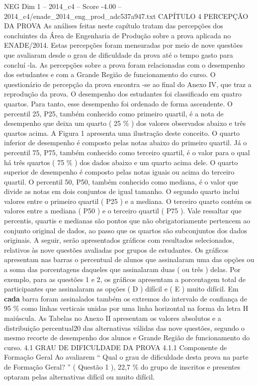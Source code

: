\begin{textsample}{NEG Dim 1 – 2014\_c4 – Score -4.00 – 2014\_c4/enade\_2014\_eng\_prod\_adc537a947.txt}  \label{ex:f1_neg_125}
CAPÍTULO 4 PERCEPÇÃO DA PROVA As análises feitas neste capítulo tratam das percepções dos concluintes da Área de Engenharia de Produção sobre a prova aplicada no ENADE/2014.
Estas percepções foram mensuradas por meio de nove questões que avaliaram desde o grau de dificuldade da prova até o tempo gasto para concluí -la.
As percepções sobre a prova foram relacionadas com o desempenho dos estudantes e com a Grande Região de funcionamento do curso.
O questionário de percepção da prova encontra -se ao final do Anexo IV, que traz a reprodução da prova.
O desempenho dos estudantes foi classificado em quatro quartos.
Para tanto, esse desempenho foi ordenado de forma ascendente.
O percentil 25, P25, também conhecido como primeiro quartil, é a nota de desempenho que deixa um quarto ( 25 \% ) dos valores observados abaixo e três quartos acima.
A Figura 1 apresenta uma ilustração deste conceito.
O quarto inferior de desempenho é composto pelas notas abaixo do primeiro quartil.
Já o percentil 75, P75, também conhecido como terceiro quartil, é o valor para o qual há três quartos ( 75 \% ) dos dados abaixo e um quarto acima dele.
O quarto superior de desempenho é composto pelas notas iguais ou acima do terceiro quartil.
O percentil 50, P50, também conhecido como mediana, é o valor que divide as notas em dois conjuntos de igual tamanho.
O segundo quarto inclui valores entre o primeiro quartil ( P25 ) e a mediana.
O terceiro quarto contém os valores entre a mediana ( P50 ) e o terceiro quartil ( P75 ).
Vale ressaltar que percentis, quartis e medianas são pontos que não obrigatoriamente pertencem ao conjunto original de dados, ao passo que os quartos são subconjuntos dos dados originais.
A seguir, serão apresentados gráficos com resultados selecionados, relativos às nove questões avaliadas por grupos de estudantes.
Os gráficos apresentam nas barras o percentual de alunos que assinalaram uma das opções ou a soma das porcentagens daqueles que assinalaram duas ( ou três ) delas.
Por exemplo, para as questões 1 e 2, os gráficos apresentam a porcentagem total de participantes que assinalaram as opções ( D ) difícil e ( E ) muito difícil.
Em \textbf{cada} barra foram assinalados também os extremos do intervalo de confiança de 95 \% como linhas verticais unidas por uma linha horizontal na forma da letra H maiúscula.
As Tabelas no Anexo II apresentam os valores absolutos e a distribuição percentual20 das alternativas válidas das nove questões, segundo o mesmo recorte de desempenho dos alunos e Grande Região de funcionamento do curso. 4.1 GRAU DE DIFICULDADE DA PROVA 4.1.1 Componente de Formação Geral Ao avaliarem “ Qual o grau de dificuldade desta prova na parte de Formação Geral? ” ( Questão 1 ), 22,7 \% do grupo de inscritos e presentes optaram pelas alternativas difícil ou muito difícil.

\end{textsample}
